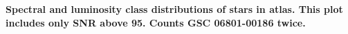 {\bf  Spectral and luminosity class distributions of stars in atlas. This plot includes only SNR above 95. Counts GSC 06801-00186 twice.\label{fig:hiso-spt-type}}